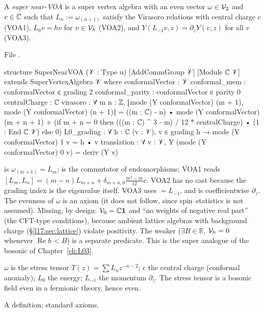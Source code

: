 \begin{definition}\label{l17:def:snvoa}
A \emph{super near-VOA} is a super vertex algebra with an even vector $\omega\in\mathcal{V}_2$ and
$c\in{\mathbb{C}}$ such that $L_n:=\omega_{(n+1)}$ satisfy the Virasoro relations with central charge $c$
(VOA1), $L_0v=hv$ for $v\in\mathcal{V}_h$ (VOA2), and $Y(L_{-1}v,z)=\partial_zY(v,z)$ for all $v$
(VOA3).
\end{definition}
\noindent File .
\begin{leancode}
structure SuperNearVOA (𝒱 : Type u) [AddCommGroup 𝒱] [Module ℂ 𝒱]
    extends SuperVertexAlgebra 𝒱 where
  conformalVector : 𝒱
  conformal_mem : conformalVector ∈ grading 2
  conformal_parity : conformalVector ∈ parity 0
  centralCharge : ℂ
  virasoro : ∀ m n : ℤ,
      ⁅mode (Y conformalVector) (m + 1), mode (Y conformalVector) (n + 1)⁆
        = ((m : ℂ) - n) • mode (Y conformalVector) (m + n + 1)
          + (if m + n = 0 then (((m : ℂ) ^ 3 - m) / 12 * centralCharge) • (1 : End ℂ 𝒱)
             else 0)
  L0_grading : ∀ {h : ℂ} (v : 𝒱), v ∈ grading h → mode (Y conformalVector) 1 v = h • v
  translation : ∀ v : 𝒱, Y (mode (Y conformalVector) 0 v) = deriv (Y v)
\end{leancode}
\begin{dictionary}
 is $\omega_{(m+1)}=L_m$;  is the commutator of
endomorphisms; VOA1 reads $[L_m,L_n]=(m-n)L_{m+n}+\delta_{m+n,0}\frac{m^3-m}{12}c$. VOA2 has no cast
because the grading index is the eigenvalue itself. VOA3 uses  $=L_{-1}$, and
 is coefficientwise $\partial_z$. The evenness of $\omega$ is an axiom (it does not follow,
since spin--statistics is not assumed). Missing, by design: $\mathcal{V}_0={\mathbb{C}}\mathbf{1}$ and
``no weights of negative real part'' (the CFT-type conditions), because ambient lattice algebras with
background charge (§\ref{l17:sec:lattice}) violate positivity. The weaker 
($\exists B\in\mathbb{R}$, $\mathcal{V}_h=0$ whenever $\operatorname{Re}h<B$) is a separate predicate. This is
the super analogue of the bosonic  of Chapter~\ref{ch:L03}.
\end{dictionary}
\begin{physics}
$\omega$ is the stress tensor $T(z)=\sum L_nz^{-n-2}$; $c$ the central charge (conformal anomaly);
$L_0$ the energy; $L_{-1}$ the momentum $\partial_z$. The stress tensor is a bosonic field even in a
fermionic theory, hence even.
\end{physics}
\begin{status}
A definition; standard axioms.
\end{status}

